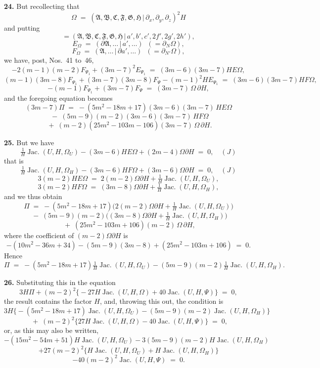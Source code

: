 \documentclass[11pt,a4paper]{article}
\providecommand{\mid}{\,|\,}
\providecommand{\Jac}{\operatorname{Jac.}}
\begin{document}
\medskip

\textbf{24.} But recollecting that
\[
\Omega \;=\; (\mathfrak{A},\mathfrak{B},\mathfrak{C},\mathfrak{F},\mathfrak{G},\mathfrak{H}\mid \partial_x,\partial_y,\partial_z)^2 H
\]
and putting
\[
= (\mathfrak{A},\mathfrak{B},\mathfrak{C},\mathfrak{F},\mathfrak{G},\mathfrak{H}\mid a',b',c',2f',2g',2h'),
\]
\[
E_\Omega \;=\; (\partial\mathfrak{A},\ldots\mid a',\ldots) \;\;(=\partial_N\Omega),
\]
\[
F_\Omega \;=\; (\mathfrak{A},\ldots\mid \partial a',\ldots) \;\;(=\partial_{N'}\Omega),
\]
we have, post, Nos.~41 to~46,
\[
-2(m-1)(m-2)F_{\Psi_1} + (3m-7)^2 E_{\Psi_1} \;=\; (3m-6)(3m-7)HE\Omega,
\]
\[
(m-1)(3m-8)F_{\Psi_1} + (3m-7)(3m-8)F_\Psi - (m-1)^2 H E_{\Psi_1} \;=\; (3m-6)(3m-7)HF\Omega,
\]
\[
-(m-1)F_{\Psi_1} + (3m-7)F_\Psi \;=\; (3m-7)\,\Omega\,\partial H,
\]
and the foregoing equation becomes
\[
(3m-7)\Pi \;=\; -(5m^2-18m+17)(3m-6)(3m-7)\,HE\Omega
\]
\[
\;-\; (5m-9)(m-2)(3m-6)(3m-7)\,HF\Omega
\]
\[
\;+\; (m-2)(25m^2-103m-106)(3m-7)\,\Omega\,\partial H.
\]

\medskip

\textbf{25.} But we have
\[
\tfrac{1}{H}\Jac(U,H,\Omega_U) - (3m-6)HE\Omega + (2m-4)\Omega\partial H \;=\; 0,\quad (J)
\]
that is
\[
\tfrac{1}{H}\Jac(U,H,\Omega_H) - (3m-6)HF\Omega + (3m-6)\Omega\partial H \;=\; 0,\quad (J)
\]
\[
3(m-2)HE\Omega \;=\; 2(m-2)\Omega\partial H + \tfrac{1}{H}\Jac(U,H,\Omega_U),
\]
\[
3(m-2)HF\Omega \;=\; (3m-8)\Omega\partial H + \tfrac{1}{H}\Jac(U,H,\Omega_H),
\]
and we thus obtain
\[
\Pi \;=\; -(5m^2-18m+17)\bigl(2(m-2)\Omega\partial H + \tfrac{1}{H}\Jac(U,H,\Omega_U)\bigr)
\]
\[
\;-\; (5m-9)(m-2)\bigl((3m-8)\Omega\partial H + \tfrac{1}{H}\Jac(U,H,\Omega_H)\bigr)
\]
\[
\;+\; (25m^2-103m+106)(m-2)\,\Omega\,\partial H,
\]
where the coefficient of $(m-2)\Omega\partial H$ is
\[
-(10m^2-36m+34) - (5m-9)(3m-8) + (25m^2-103m+106) \;=\; 0.
\]
Hence
\[
\Pi \;=\; -(5m^2-18m+17)\tfrac{1}{H}\Jac(U,H,\Omega_U) - (5m-9)(m-2)\tfrac{1}{H}\Jac(U,H,\Omega_H).
\]

\medskip

\textbf{26.} Substituting this in the equation
\[
3H\Pi + (m-2)^2\bigl\{-27H\Jac(U,H,\Omega) + 40\Jac(U,H,\Psi)\bigr\} \;=\; 0,
\]
the result contains the factor $H$, and, throwing this out, the condition is
\[
3H\bigl\{-(5m^2-18m+17)\Jac(U,H,\Omega_U) - (5m-9)(m-2)\Jac(U,H,\Omega_H)\bigr\}
\]
\[
\;+\; (m-2)^2\bigl\{27H\Jac(U,H,\Omega) - 40\Jac(U,H,\Psi)\bigr\} \;=\; 0,
\]
or, as this may also be written,
\[
-(15m^2-54m+51)H\Jac(U,H,\Omega_U) - 3(5m-9)(m-2)H\Jac(U,H,\Omega_H)
\]
\[
+ 27(m-2)^2\bigl\{H\Jac(U,H,\Omega_U) + H\Jac(U,H,\Omega_H)\bigr\}
\]
\[
- 40(m-2)^2\Jac(U,H,\Psi) \;=\; 0.
\]
\end{document}
